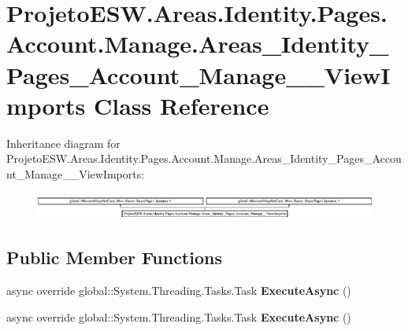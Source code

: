 \hypertarget{class_projeto_e_s_w_1_1_areas_1_1_identity_1_1_pages_1_1_account_1_1_manage_1_1_areas___identity223b6bd2eddef8f334e0a25500482741}{}\section{Projeto\+E\+S\+W.\+Areas.\+Identity.\+Pages.\+Account.\+Manage.\+Areas\+\_\+\+Identity\+\_\+\+Pages\+\_\+\+Account\+\_\+\+Manage\+\_\+\+\_\+\+View\+Imports Class Reference}
\label{class_projeto_e_s_w_1_1_areas_1_1_identity_1_1_pages_1_1_account_1_1_manage_1_1_areas___identity223b6bd2eddef8f334e0a25500482741}
Inheritance diagram for Projeto\+E\+S\+W.\+Areas.\+Identity.\+Pages.\+Account.\+Manage.\+Areas\+\_\+\+Identity\+\_\+\+Pages\+\_\+\+Account\+\_\+\+Manage\+\_\+\+\_\+\+View\+Imports\+:\begin{figure}[H]
\begin{center}
\leavevmode
\includegraphics[height=0.896000cm]{class_projeto_e_s_w_1_1_areas_1_1_identity_1_1_pages_1_1_account_1_1_manage_1_1_areas___identity223b6bd2eddef8f334e0a25500482741}
\end{center}
\end{figure}
\subsection*{Public Member Functions}
\begin{DoxyCompactItemize}
\item 
\mbox{\label{class_projeto_e_s_w_1_1_areas_1_1_identity_1_1_pages_1_1_account_1_1_manage_1_1_areas___identity223b6bd2eddef8f334e0a25500482741_ac40047068cf0d7704102a600bd054510}} 
async override global\+::\+System.\+Threading.\+Tasks.\+Task {\bfseries Execute\+Async} ()
\item 
\mbox{\label{class_projeto_e_s_w_1_1_areas_1_1_identity_1_1_pages_1_1_account_1_1_manage_1_1_areas___identity223b6bd2eddef8f334e0a25500482741_ac40047068cf0d7704102a600bd054510}} 
async override global\+::\+System.\+Threading.\+Tasks.\+Task {\bfseries Execute\+Async} ()
\end{DoxyCompactItemize}
